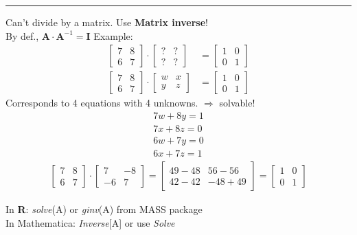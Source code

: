 \documentclass{article}
\newcommand{\ind}{\-\hspace{1cm}}
\begin{document}
\rule[0.5ex]{\linewidth}{1pt}
Can't divide by a matrix.  Use \textbf{Matrix inverse}!\\
\ind By def., $\mathbf{A}\cdot \mathbf{A}^{-1}=\mathbf{I}$
Example:
\begin{align*}
	\begin{bmatrix} 7 & 8 \\ 6 & 7 \end{bmatrix} \cdot \begin{bmatrix} ? & ? \\ ? & ? \end{bmatrix}& = \begin{bmatrix}1 & 0\\0 & 1 \end{bmatrix}\\
	\begin{bmatrix} 7 & 8 \\ 6 & 7 \end{bmatrix} \cdot \begin{bmatrix} w & x \\ y & z \end{bmatrix} &= \begin{bmatrix}1 & 0\\0 & 1 \end{bmatrix}
\end{align*}
Corresponds to 4 equations with 4 unknowns.  $\Rightarrow$ solvable!
\begin{align*}
	7 w + 8 y = 1\\
	7 x + 8 z = 0\\
	6 w + 7 y = 0\\
	6 x + 7 z = 1
\end{align*}
\begin{align*}
	\begin{bmatrix} 7 & 8 \\ 6 & 7 \end{bmatrix} \cdot \begin{bmatrix} 7 & -8 \\ -6 & 7 \end{bmatrix} =\begin{bmatrix} 49-48 & 56-56 \\ 42-42 & -48+49 \end{bmatrix}= \begin{bmatrix}1 & 0\\0 & 1 \end{bmatrix}
\end{align*}

In \textbf{R}: \emph{solve}(A) or \emph{ginv}(A) from MASS package\\
In Mathematica: \emph{Inverse}[A] or use \emph{Solve}\\
\end{document}

